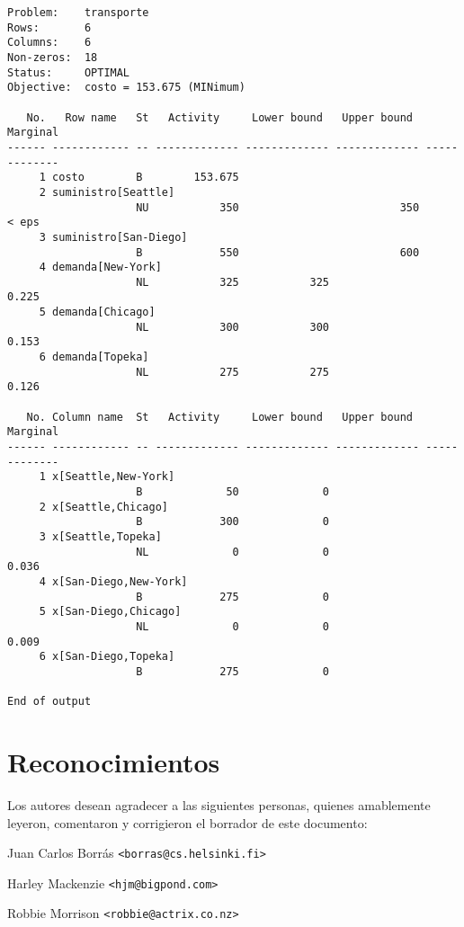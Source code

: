 \documentclass[11pt,spanish]{report}
\begin{document}
\begin{verbatim}
Problem:    transporte
Rows:       6
Columns:    6
Non-zeros:  18
Status:     OPTIMAL
Objective:  costo = 153.675 (MINimum)

   No.   Row name   St   Activity     Lower bound   Upper bound    Marginal
------ ------------ -- ------------- ------------- ------------- -------------
     1 costo        B        153.675
     2 suministro[Seattle]
                    NU           350                         350         < eps
     3 suministro[San-Diego]
                    B            550                         600
     4 demanda[New-York]
                    NL           325           325                       0.225
     5 demanda[Chicago]
                    NL           300           300                       0.153
     6 demanda[Topeka]
                    NL           275           275                       0.126

   No. Column name  St   Activity     Lower bound   Upper bound    Marginal
------ ------------ -- ------------- ------------- ------------- -------------
     1 x[Seattle,New-York]
                    B             50             0
     2 x[Seattle,Chicago]
                    B            300             0
     3 x[Seattle,Topeka]
                    NL             0             0                       0.036
     4 x[San-Diego,New-York]
                    B            275             0
     5 x[San-Diego,Chicago]
                    NL             0             0                       0.009
     6 x[San-Diego,Topeka]
                    B            275             0

End of output
\end{verbatim}


\newpage

\section*{Reconocimientos}

Los autores desean agradecer a las siguientes personas, quienes amablemente leyeron, comentaron y corrigieron el borrador de este documento:

\noindent Juan Carlos Borrás \verb|<borras@cs.helsinki.fi>|

\noindent Harley Mackenzie \verb|<hjm@bigpond.com>|

\noindent Robbie Morrison \verb|<robbie@actrix.co.nz>|
\end{document}
